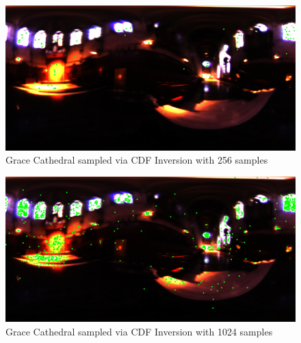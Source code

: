 \documentclass[a4paper,12pt,oneside,final]{report}
\newenvironment{changemargin}[2]{\begin{list}{}{%
\setlength{\topsep}{0pt}%
\setlength{\leftmargin}{0pt}%
\setlength{\rightmargin}{0pt}%
\setlength{\listparindent}{\parindent}%
\setlength{\itemindent}{\parindent}%
\setlength{\parsep}{0pt plus 1pt}%
\addtolength{\leftmargin}{#1}%
\addtolength{\rightmargin}{#2}%
}\item }{\end{list}}
\begin{document}
\begin{figure}[!h]
  \begin{changemargin}{-50mm}{-50mm}
    \center
    \includegraphics[scale=0.4]{grace_cdf_64.png}
    \caption{Grace Cathedral sampled via CDF Inversion with 256 samples \label{fig:grace_cdf_256}}
  \end{changemargin}
\end{figure}

\begin{figure}[!h]
  \begin{changemargin}{-50mm}{-50mm}
    \center
    \includegraphics[scale=0.4]{grace_cdf_1024.png}
    \caption{Grace Cathedral sampled via CDF Inversion with 1024 samples \label{fig:grace_cdf_1024}}
  \end{changemargin}
\end{figure}
\end{document}
